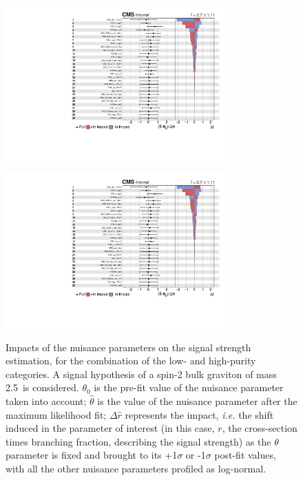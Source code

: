 \begin{figure}[!h]
   \caption{Impacts of the nuisance parameters on the signal strength estimation, for the combination of the low- and high-purity categories. A signal hypothesis of a spin-2 bulk graviton of mass 2.5~\TeV is considered. $\theta_0$ is the pre-fit value of the nuisance parameter taken into account; $\hat{\theta}$ is the value of the nuisance parameter after the maximum likelihood fit; $\Delta \hat{r}$ represents the impact, \textit{i.e.} the shift induced in the parameter of interest (in this case, $r$, the cross-section times branching fraction, describing the signal strength) as the $\theta$ parameter is fixed and brought to its +1$\sigma$ or -1$\sigma$ post-fit values, with all the other nuisance parameters profiled as log-normal.}
 \begin{center}
   \includegraphics[width=0.75\textwidth]{impacts_VZ_data_1fb/impacts_XZZInv_XVZnn_M2500.pdf}

   \includegraphics[page=2, width=0.75\textwidth]{impacts_VZ_data_1fb/impacts_XZZInv_XVZnn_M2500.pdf}
   \label{fig:impacts}
 \end{center}
\end{figure}


